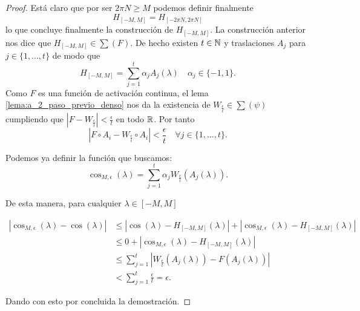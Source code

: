 \begin{proof}
    Está claro que por ser $2 \pi N \geq M$ podemos definir 
    finalmente 
    \begin{equation}
        H_{[-M, M]} = H_{[-2\pi N, 2 \pi N]}
    \end{equation}
    lo que concluye finalmente la construcción de $H_{[-M, M]}.$
    La construcción anterior nos dice que $H_{[-M, M]} \in \sum(F)$. 
    De hecho existen $t \in \mathbb{N}$ y traslaciones $A_j$ para 
    $j \in \{1, \ldots, t\}$ de modo que 
    \begin{equation}
        H_{[-M, M]} = \sum_{j=1}^t \alpha_j A_j(\lambda) 
        \quad 
        \alpha_j \in \{-1,1\}. 
    \end{equation}
    Como $F$ es una función de activación continua, el lema \ref{lema:a_2_paso_previo_denso}
    nos da la existencia de 
    $W_\frac{\epsilon}{t} \in \sum(\psi)$ cumpliendo que 
    $|F - W_{ \frac{\epsilon}{t}} | < \frac{\epsilon}{t}$ en todo $\mathbb{R}$.
    Por tanto 
    \begin{equation}
        |F \circ A_i - W_{ \frac{\epsilon}{t}} \circ A_i |
         < \frac{\epsilon}{t}
         \quad 
         \forall j \in \{1, \ldots, t\}
         . 
    \end{equation}

Podemos ya definir la función que buscamos: 
    \begin{equation}
        \cos_{M, \epsilon}(\lambda) = \sum_{j=1}^t 
        \alpha_j  W_{ \frac{\epsilon}{t}}(A_j(\lambda)). 
    \end{equation}

    De esta manera, para cualquier $\lambda \in [-M, M]$

    \begin{equation}
        \begin{split}
            |\cos_{M,\epsilon}(\lambda) - \cos(\lambda)| 
            &\leq
            |\cos(\lambda) -  H_{[- M, M]}(\lambda)|
            + 
            | \cos_{M,\epsilon}(\lambda) -  H_{[- M, M]}(\lambda)|  \\
            &\leq  0 
            + | \cos_{M,\epsilon}(\lambda) -  H_{[- M, M]}(\lambda)| \\
            & \leq  \sum_{j=1}^t 
            |  W_{ \frac{\epsilon}{t}}(A_j(\lambda)) 
            -
            F( A_j(\lambda))
             | \\
             & <   \sum_{j=1}^t \frac{\epsilon}{t} = \epsilon .
        \end{split}
    \end{equation}

    Dando con esto por concluida la demostración. 
\end{proof}

